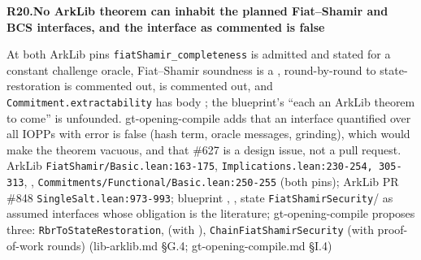\par\medskip\noindent\textbf{R20.}\enspace\textbf{No ArkLib theorem can inhabit the planned Fiat–Shamir and BCS interfaces, and the interface as commented is false}\par\nopagebreak
{} At both ArkLib pins \texttt{fiat\allowbreak{}Shamir\_\allowbreak{}completeness} is admitted and stated for a constant challenge oracle, Fiat–Shamir soundness is a , round-by-round to state-restoration is commented out,  is commented out, and \texttt{Commitment.\allowbreak{}extractability} has body ; the blueprint's ``each an ArkLib theorem to come'' is unfounded. gt-opening-compile adds that an interface quantified over all IOPPs with error  is false (hash term, oracle messages, grinding), which would make the theorem vacuous, and that \#627 is a design issue, not a pull request.
 ArkLib \texttt{Fiat\allowbreak{}Shamir/\allowbreak{}Basic.\allowbreak{}lean:\allowbreak{}163-\allowbreak{}175}, \texttt{Implications.\allowbreak{}lean:\allowbreak{}230-\allowbreak{}254,\allowbreak{} 305-\allowbreak{}313}, , \texttt{Commitments/\allowbreak{}Functional/\allowbreak{}Basic.\allowbreak{}lean:\allowbreak{}250-\allowbreak{}255} (both pins); ArkLib PR \#848 \texttt{Single\allowbreak{}Salt.\allowbreak{}lean:\allowbreak{}973-\allowbreak{}993}; blueprint , , 
 state \texttt{Fiat\allowbreak{}Shamir\allowbreak{}Security}/ as assumed interfaces whose obligation is the literature; gt-opening-compile proposes three: \texttt{Rbr\allowbreak{}To\allowbreak{}State\allowbreak{}Restoration},  (with ), \texttt{Chain\allowbreak{}Fiat\allowbreak{}Shamir\allowbreak{}Security} (with proof-of-work rounds) (lib-arklib.md §G.4; gt-opening-compile.md §I.4)

